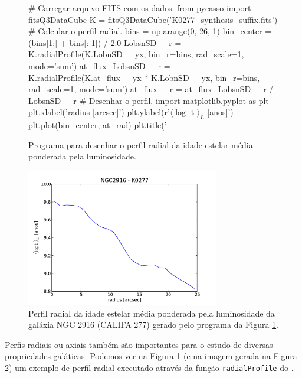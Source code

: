 \begin{figure}
	\begin{python}
# Carregar arquivo FITS com os dados.
from pycasso import fitsQ3DataCube
K = fitsQ3DataCube('K0277_synthesis_suffix.fits')
# Calcular o perfil radial.
bins = np.arange(0, 26, 1)
bin_center = (bins[1:] + bins[:-1]) / 2.0
LobsnSD__r = K.radialProfile(K.LobnSD__yx, bin_r=bins, 
							 rad_scale=1, mode='sum')
at_flux_LobsnSD__r = K.radialProfile(K.at_flux__yx * K.LobnSD__yx, 
									 bin_r=bins, rad_scale=1, 
									 mode='sum')
at_flux__r = at_flux_LobsnSD__r / LobsnSD__r 
# Desenhar o perfil.
import matplotlib.pyplot as plt
plt.xlabel('radius [arcsec]')
plt.ylabel(r'$\langle \log$ t $\rangle_L$ [anos]')
plt.plot(bin_center, at_rad)
plt.title('%
	\end{python}
	\caption[Exemplo de programa para perfil radial.]
	{Programa para desenhar o perfil radial da idade estelar média ponderada pela
	luminosidade.}
	\label{fig:programaPerfRad}
\end{figure}

\begin{figure}
	\includegraphics[width=0.75\textwidth]{figuras/K0277-at_flux_radprof.pdf}
	\caption[Perfil radial da idade estelar média da galáxia NGC 2916 (CALIFA 277).]
	{Perfil radial da idade estelar média ponderada pela luminosidade da galáxia
	NGC 2916 (CALIFA 277) gerado pelo programa da Figura \ref{fig:programaPerfRad}.}
	\label{fig:perfRad}
\end{figure}

Perfis radiais ou axiais também são importantes para o estudo de diversas propriedades galáticas. Podemos ver na Figura
\ref{fig:programaPerfRad} (e na imagem gerada na Figura \ref{fig:perfRad}) um exemplo de perfil radial executado
através da função \texttt{radialProfile} do \pycasso.

